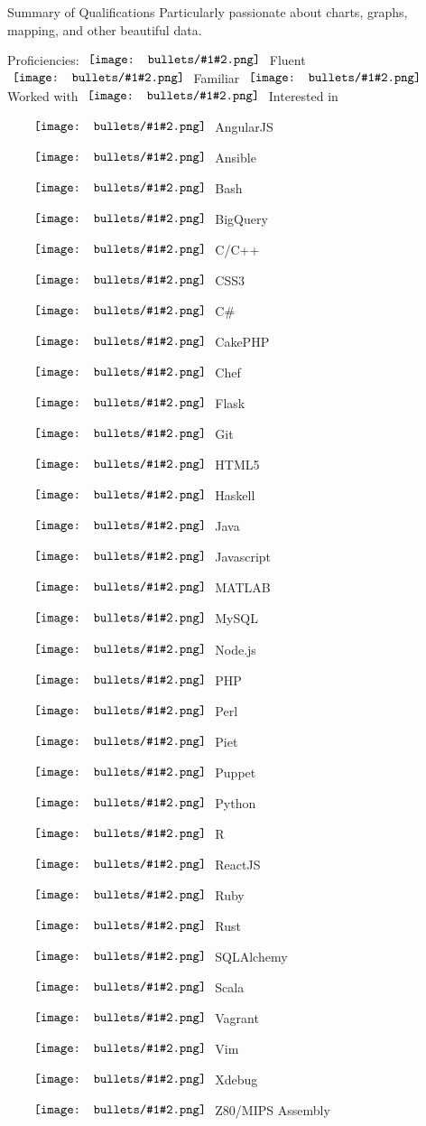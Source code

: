 \documentclass[letterpaper,10pt]{article}
\newcommand{\gbullet}[2][circle]{
  \vcenter{\hbox{
    \texttt{[image: bullets/\#1\#2.png]}
    \vspace{2pt}
  }}
}
\begin{document}
\begin{res_section}{Summary of Qualifications}
  \vskip 4pt Particularly passionate about charts, graphs, mapping, and other beautiful data.
\begin{res_content}{Proficiencies: \small \hfill $\gbullet{4}$ Fluent $\gbullet{3}$ Familiar $\gbullet{2}$ Worked with $\gbullet{1}$ Interested in}
  \rmfamily \normalsize
  \def \multicolsep {4pt}
  \setlength{\columnsep}{2pt}
  \begin{multicols}{6}
  \begin{itemize}[labelsep=0em]
    \item[$\gbullet{4}$] AngularJS
    \item[$\gbullet{3}$] Ansible
    \item[$\gbullet{3}$] Bash
    \item[$\gbullet{3}$] BigQuery
    \item[$\gbullet{3}$] C/C++
    \item[$\gbullet{4}$] CSS3
    \item[$\gbullet{3}$] C\#
    \item[$\gbullet{4}$] CakePHP
    \item[$\gbullet{3}$] Chef
    \item[$\gbullet{3}$] Flask
    \item[$\gbullet{4}$] Git
    \item[$\gbullet{4}$] HTML5
    \item[$\gbullet{2}$] Haskell
    \item[$\gbullet{3}$] Java
    \item[$\gbullet{4}$] Javascript
    \item[$\gbullet{2}$] MATLAB
    \item[$\gbullet{4}$] MySQL
    \item[$\gbullet{3}$] Node.js
    \item[$\gbullet{4}$] PHP
    \item[$\gbullet{3}$] Perl
    \item[$\gbullet{2}$] Piet
    \item[$\gbullet{4}$] Puppet
    \item[$\gbullet{4}$] Python
    \item[$\gbullet{3}$] R
    \item[$\gbullet{3}$] ReactJS
    \item[$\gbullet{2}$] Ruby
    \item[$\gbullet{1}$] Rust
    \item[$\gbullet{3}$] SQLAlchemy
    \item[$\gbullet{1}$] Scala
    \item[$\gbullet{4}$] Vagrant
    \item[$\gbullet{4}$] Vim
    \item[$\gbullet{4}$] Xdebug
    \item[$\gbullet{2}$] Z80/MIPS \newline Assembly
  \end{itemize}
  \end{multicols}
\end{res_content}
\end{res_section}
\end{document}
